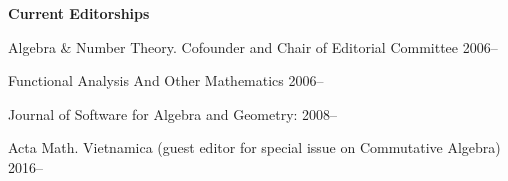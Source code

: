 \smallskip
{\bf Current Editorships}
\smallskip
%
\item{}Algebra \& Number Theory. Cofounder and Chair of Editorial Committee 2006--
\item{}Functional Analysis And Other Mathematics 2006--
\item{} Journal of Software for Algebra and Geometry: 2008--
\item{} Acta Math. Vietnamica (guest editor for special issue on Commutative Algebra) 2016--

